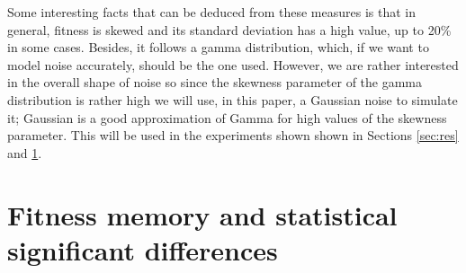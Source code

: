 \documentclass{svmult}
\begin{document}
Some interesting facts that can be deduced from these measures is that
in general, fitness is skewed and its standard deviation has a high
value, up to 20\% in some cases. Besides, it
follows a gamma distribution, which, if we want to model noise
accurately, should be the one used. However, we are rather interested
in the overall shape of noise so since the skewness parameter of the gamma
distribution is rather high we will use, in this paper, a Gaussian
noise to simulate it; Gaussian is a good approximation of Gamma for
high values of the skewness parameter. This will be used in the experiments shown
shown  in Sections \ref{sec:res} and \ref{sec:wilcoxon}.

\section{Fitness memory and statistical significant differences}
\label{sec:wilcoxon}
\end{document}
